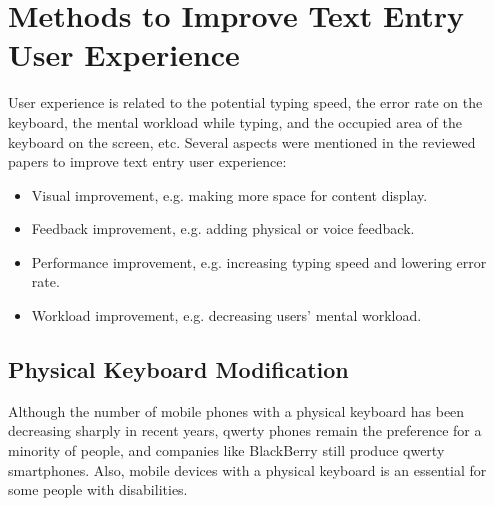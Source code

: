 \documentclass[11pt]{article}
\begin{document}
\section{Methods to Improve Text Entry User Experience}\label{section-improvement}
User experience is related to the potential typing speed, the error rate on the keyboard, the mental workload while typing, and the occupied area of the keyboard on the screen, etc. Several aspects were mentioned in the reviewed papers to improve text entry user experience: 
\begin{itemize}
    \item Visual improvement, e.g. making more space for content display.
    \item Feedback improvement, e.g. adding physical or voice feedback.
    \item Performance improvement, e.g. increasing typing speed and lowering error rate.
    \item Workload improvement, e.g. decreasing users' mental workload.
\end{itemize}
\subsection{Physical Keyboard Modification}
Although the number of mobile phones with a physical keyboard has been decreasing sharply in recent years, qwerty phones remain the preference for a minority of people, and companies like BlackBerry still produce qwerty smartphones. Also, mobile devices with a physical keyboard is an essential for some people with disabilities. 
\end{document}

